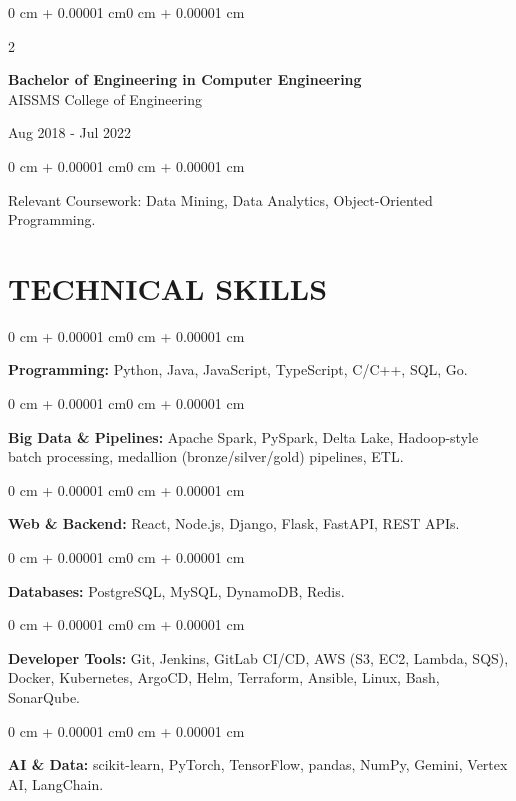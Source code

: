 \documentclass[10pt, letterpaper]{article}
\newenvironment{onecolentry}{
    \begin{adjustwidth}{0 cm + 0.00001 cm}{0 cm + 0.00001 cm}
}{
    \end{adjustwidth}
}
\newenvironment{twocolentry}[2][]{
    \onecolentry
    \def\secondColumn{#2}
    \setcolumnwidth{\fill, 4.5 cm}
    \begin{paracol}{2}
}{
    \switchcolumn \raggedleft \secondColumn
    \end{paracol}
    \endonecolentry
}
\begin{document}
\begin{twocolentry}{
    Aug 2018 - Jul 2022
}
    \textbf{Bachelor of Engineering in Computer Engineering} \\
    AISSMS College of Engineering
\end{twocolentry}
\begin{onecolentry}
Relevant Coursework: Data Mining, Data Analytics, Object-Oriented Programming.
\end{onecolentry}
\section{TECHNICAL SKILLS}
\begin{onecolentry}
\textbf{Programming:} Python, Java, JavaScript, TypeScript, C/C++, SQL, Go.
\end{onecolentry}
\vspace{0.04 cm}
\begin{onecolentry}
\textbf{Big Data \& Pipelines:} Apache Spark, PySpark, Delta Lake, Hadoop-style batch processing, medallion (bronze/silver/gold) pipelines, ETL.
\end{onecolentry}
\vspace{0.04 cm}
\begin{onecolentry}
\textbf{Web \& Backend:} React, Node.js, Django, Flask, FastAPI, REST APIs.
\end{onecolentry}
\vspace{0.04 cm}
\begin{onecolentry}
\textbf{Databases:} PostgreSQL, MySQL, DynamoDB, Redis.
\end{onecolentry}
\vspace{0.04 cm}
\begin{onecolentry}
\textbf{Developer Tools:} Git, Jenkins, GitLab CI/CD, AWS (S3, EC2, Lambda, SQS), Docker, Kubernetes, ArgoCD, Helm, Terraform, Ansible, Linux, Bash, SonarQube.
\end{onecolentry}
\vspace{0.04 cm}
\begin{onecolentry}
\textbf{AI \& Data:} scikit-learn, PyTorch, TensorFlow, pandas, NumPy, Gemini, Vertex AI, LangChain.
\end{onecolentry}

\end{document}

